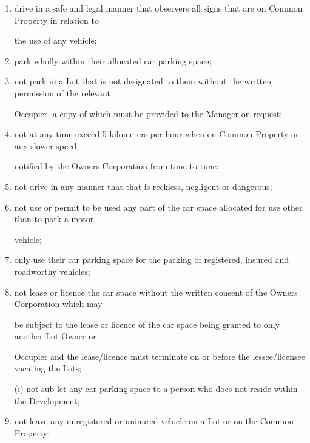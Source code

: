 \documentclass{article}
\begin{document}
\begin{enumerate}[label=\arabic*.]
\begin{enumerate}[label=\arabic{enumi}.\arabic*.]
\begin{enumerate}[label=(\arabic*)]
\begin{enumerate}[label=(\alph*)]
\item {\fontsize{9.962}{1} drive in a safe and legal manner that observers all signs that are on Common Property in relation to }

{\fontsize{10.02}{1}the use of any vehicle; }

\item {\fontsize{9.962}{1} park wholly within their allocated car parking space; }

\item {\fontsize{9.962}{1} not park in a Lot that is not designated to them without the written permission of the relevant }

{\fontsize{10.02}{1}Occupier, a copy of which must be provided to the Manager on request; }

\item {\fontsize{9.962}{1} not at any time exceed 5 kilometers per hour when on Common Property or any slower speed }

{\fontsize{10.02}{1}notified by the Owners Corporation from time to time; }

\item {\fontsize{9.962}{1} not drive in any manner that that is reckless, negligent or dangerous; }

\item {\fontsize{9.962}{1} not use or permit to be used any part of the car space allocated for use other than to park a motor }

{\fontsize{10.02}{1}vehicle; }

\item {\fontsize{9.962}{1} only use their car parking space for the parking of registered, insured and roadworthy vehicles; }

\item {\fontsize{9.962}{1} not lease or licence the car space without the written consent of the Owners Corporation which may }

{\fontsize{10.02}{1}be subject to the lease or licence of the car space being granted to only another Lot Owner or }

{\fontsize{10.02}{1}Occupier and the lease/licence must terminate on or before the lessee/licensee vacating the Lots; }

{\fontsize{9.962}{1}(i) not sub-let any car parking space to a person who does not reside within the Development; }

\item {\fontsize{9.962}{1} not leave any unregistered or uninured vehicle on a Lot or on the Common Property; }


\end{enumerate}
\end{enumerate}
\end{enumerate}
\end{enumerate}
\end{document}

